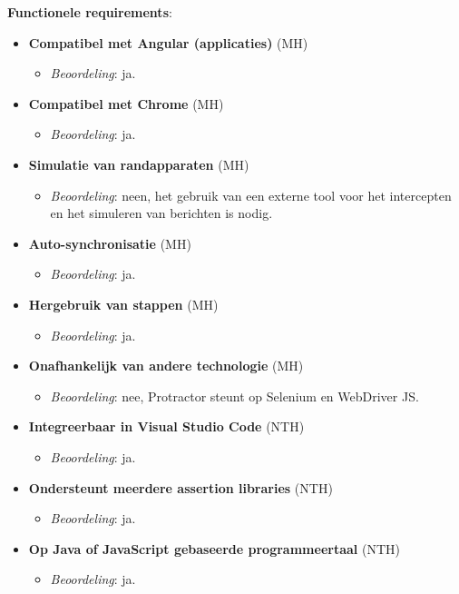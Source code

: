 \textbf{Functionele requirements}:
\begin{itemize}
	\item \textbf{Compatibel met Angular (applicaties)} (MH)
	\begin{itemize}
		\item \emph{Beoordeling}: ja.
	\end{itemize}
	\item \textbf{Compatibel met Chrome} (MH)
	\begin{itemize}
		\item \emph{Beoordeling}: ja.
	\end{itemize}
	\item \textbf{Simulatie van randapparaten} (MH)
	\begin{itemize}
		\item \emph{Beoordeling}: neen, het gebruik van een externe tool voor het intercepten en het simuleren van berichten is nodig.
	\end{itemize}
	\item \textbf{Auto-synchronisatie} (MH)
	\begin{itemize}
		\item \emph{Beoordeling}: ja.
	\end{itemize}
	\item \textbf{Hergebruik van stappen} (MH)
	\begin{itemize}
		\item \emph{Beoordeling}: ja.
	\end{itemize}
	\item \textbf{Onafhankelijk van andere technologie} (MH)
	\begin{itemize}
		\item \emph{Beoordeling}: nee, Protractor steunt op Selenium en WebDriver JS.
	\end{itemize}
	\item \textbf{Integreerbaar in Visual Studio Code} (NTH)
	\begin{itemize}
		\item \emph{Beoordeling}: ja.
	\end{itemize}
	\item \textbf{Ondersteunt meerdere assertion libraries} (NTH)
	\begin{itemize}
		\item \emph{Beoordeling}: ja.
	\end{itemize}
	\item \textbf{Op Java of JavaScript gebaseerde programmeertaal} (NTH)
	\begin{itemize}
		\item \emph{Beoordeling}: ja.
	\end{itemize}
\end{itemize}


